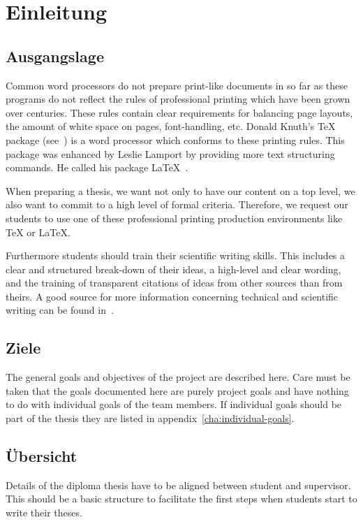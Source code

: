 \chapter{Einleitung}
\section{Ausgangslage}
Common word processors do not prepare print-like documents in so far as these programs do not reflect the rules of professional printing which have been grown over centuries. These rules contain clear requirements for balancing page layouts, the amount of white space on pages, font-handling, etc. Donald Knuth's TeX package (see~\cite{knuth_texbook_1984}) is a word processor which conforms to these printing rules. This package was enhanced by Leslie Lamport by providing more text structuring commands. He called his package LaTeX~\cite{lamport_latex_1985}.

When preparing a thesis, we want not only to have our content on a top level, we also want to commit to a high level of formal criteria. Therefore, we request our students to use one of these professional printing production environments like TeX or LaTeX.

Furthermore students should train their scientific writing skills. This includes a clear and structured break-down of their ideas, a high-level and clear wording, and the training of transparent citations of ideas from other sources than from theirs. A good source for more information concerning technical and scientific writing can be found in~\cite{rechenberg_technisches_2006}.

\section{Ziele}
The general goals and objectives of the project are described here. Care must be taken that the goals documented here are purely project goals and have nothing to do with individual goals of the team members. If individual goals should be part of the thesis they are listed in appendix~\ref{cha:individual-goals}.

\section{Übersicht}
Details of the diploma thesis have to be aligned between student and supervisor. This should be a basic structure to facilitate the first steps when students start to write their theses.

